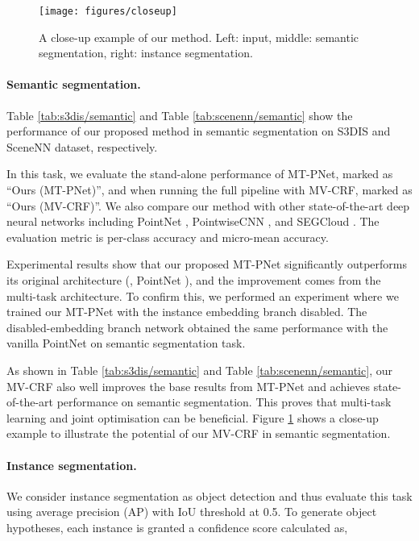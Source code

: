 \documentclass[10pt,twocolumn,letterpaper]{article}
\begin{document}
\begin{figure}[h!t]
  \centering
  \texttt{[image: figures/closeup]}
  \caption{A close-up example of our method. Left: input, middle: semantic
    segmentation, right: instance segmentation.}
  \label{fig:closeup}
\end{figure}

\paragraph{Semantic segmentation.}
Table \ref{tab:s3dis/semantic} and Table \ref{tab:scenenn/semantic} show the
performance of our proposed method in semantic segmentation on S3DIS and SceneNN
dataset, respectively.

In this task, we evaluate the stand-alone performance of MT-PNet, marked as
``Ours (MT-PNet)'', and when running the full pipeline with MV-CRF, marked as
``Ours (MV-CRF)''. We also compare our method with other state-of-the-art deep
neural networks including PointNet \cite{qi-pointnet-cvpr17}, PointwiseCNN
\cite{hua-pointwise-cvpr18}, and SEGCloud \cite{tchapmi-segcloud-3dv17}. The
evaluation metric is per-class accuracy and micro-mean accuracy.

Experimental results show that our proposed MT-PNet significantly outperforms
its original architecture (\ie, PointNet \cite{qi-pointnet-cvpr17}), and the
improvement comes from the multi-task architecture. To confirm this, we
performed an experiment where we trained our MT-PNet with the instance embedding
branch disabled. The disabled-embedding branch network obtained the same
performance with the vanilla PointNet on semantic segmentation task.

As shown in Table \ref{tab:s3dis/semantic} and Table \ref{tab:scenenn/semantic},
our MV-CRF also well improves the base results from MT-PNet and achieves
state-of-the-art performance on semantic segmentation. This proves that
multi-task learning and joint optimisation can be beneficial. Figure
\ref{fig:closeup} shows a close-up example to illustrate the potential of our
MV-CRF in semantic segmentation.

\paragraph{Instance segmentation.}

We consider instance segmentation as object detection and thus evaluate this
task using average precision (AP) with IoU threshold at 0.5. To generate object
hypotheses, each instance  is granted a confidence score  calculated as,
\end{document}
